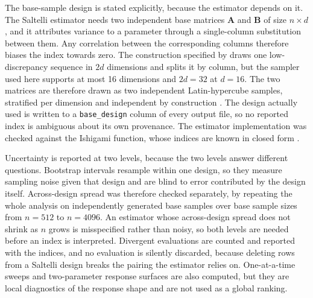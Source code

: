 The base-sample design is stated explicitly, because the estimator depends on
it. The Saltelli estimator needs two independent base matrices $\mathbf{A}$ and
$\mathbf{B}$ of size $n \times d$, and it attributes variance to a parameter
through a single-column substitution between them. Any correlation between the
corresponding columns therefore biases the index towards zero. The construction
specified by \citet{Saltelli2010} draws one low-discrepancy sequence in $2d$
dimensions and splits it by column, but the sampler used here supports at most
16 dimensions and $2d=32$ at $d=16$. The two matrices are therefore drawn as two
independent Latin-hypercube samples, stratified per dimension and independent by
construction \citep{McKay1979}. The design actually used is written to a
\texttt{base\_design} column of every output file, so no reported index is
ambiguous about its own provenance. The estimator implementation was checked
against the Ishigami function, whose indices are known in closed form
\citep{Ishigami1990}.

Uncertainty is reported at two levels, because the two levels answer different
questions. Bootstrap intervals resample within one design, so they measure
sampling noise given that design and are blind to error contributed by the
design itself. Across-design spread was therefore checked separately, by
repeating the whole analysis on independently generated base samples over base
sample sizes from $n=512$ to $n=4096$. An estimator whose across-design spread
does not shrink as $n$ grows is misspecified rather than noisy, so both levels
are needed before an index is interpreted. Divergent evaluations are counted and
reported with the indices, and no evaluation is silently discarded, because
deleting rows from a Saltelli design breaks the pairing the estimator relies on.
One-at-a-time sweeps and two-parameter response surfaces are also computed, but
they are local diagnostics of the response shape and are not used as a global
ranking.
